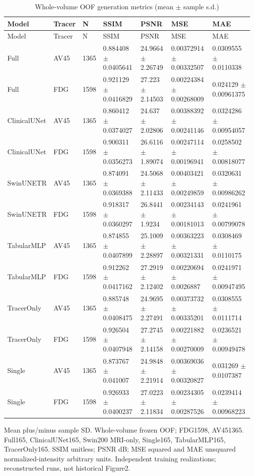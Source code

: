 \begin{landscape}
\begingroup
\footnotesize
\setlength{\tabcolsep}{4pt}
\begin{longtable}{lllllll}
\caption{Whole-volume OOF generation metrics (mean $\pm$ sample s.d.)}\label{tab:whole_volume_generation}\\
\toprule
Model & Tracer & N & SSIM & PSNR & MSE & MAE \\
\midrule
\endfirsthead
\toprule
Model & Tracer & N & SSIM & PSNR & MSE & MAE \\
\midrule
\endhead
\bottomrule
\endfoot
Full & AV45 & 1365 & 0.884408 \(\pm\) 0.0405641 & 24.9664 \(\pm\) 2.26749 & 0.00372914 \(\pm\) 0.00332507 & 0.0309555 \(\pm\) 0.0110338 \\
Full & FDG & 1598 & 0.921129 \(\pm\) 0.0416829 & 27.223 \(\pm\) 2.14503 & 0.00224384 \(\pm\) 0.00268009 & 0.024129 \(\pm\) 0.00961375 \\
ClinicalUNet & AV45 & 1365 & 0.860412 \(\pm\) 0.0374027 & 24.637 \(\pm\) 2.02806 & 0.00388392 \(\pm\) 0.00241146 & 0.0324286 \(\pm\) 0.00954057 \\
ClinicalUNet & FDG & 1598 & 0.900311 \(\pm\) 0.0356273 & 26.6116 \(\pm\) 1.89074 & 0.00247114 \(\pm\) 0.00196941 & 0.0258502 \(\pm\) 0.00818077 \\
SwinUNETR & AV45 & 1365 & 0.874091 \(\pm\) 0.0369388 & 24.5068 \(\pm\) 2.11433 & 0.00403421 \(\pm\) 0.00249859 & 0.0320631 \(\pm\) 0.00986262 \\
SwinUNETR & FDG & 1598 & 0.918317 \(\pm\) 0.0360297 & 26.8441 \(\pm\) 1.9234 & 0.00234143 \(\pm\) 0.00181013 & 0.0241961 \(\pm\) 0.00799078 \\
TabularMLP & AV45 & 1365 & 0.874855 \(\pm\) 0.0407899 & 25.1009 \(\pm\) 2.28897 & 0.00363223 \(\pm\) 0.00321331 & 0.0308469 \(\pm\) 0.0110175 \\
TabularMLP & FDG & 1598 & 0.912262 \(\pm\) 0.0417162 & 27.2919 \(\pm\) 2.12402 & 0.00220694 \(\pm\) 0.0026887 & 0.0241971 \(\pm\) 0.00947495 \\
TracerOnly & AV45 & 1365 & 0.885748 \(\pm\) 0.0408475 & 24.9695 \(\pm\) 2.27491 & 0.00373732 \(\pm\) 0.00335201 & 0.0308555 \(\pm\) 0.0111714 \\
TracerOnly & FDG & 1598 & 0.926504 \(\pm\) 0.0407948 & 27.2745 \(\pm\) 2.14158 & 0.00221882 \(\pm\) 0.00270009 & 0.0236521 \(\pm\) 0.00949478 \\
Single & AV45 & 1365 & 0.873767 \(\pm\) 0.041007 & 24.9848 \(\pm\) 2.21914 & 0.00369036 \(\pm\) 0.00320827 & 0.031269 \(\pm\) 0.0107387 \\
Single & FDG & 1598 & 0.926933 \(\pm\) 0.0400237 & 27.0223 \(\pm\) 2.11834 & 0.00234305 \(\pm\) 0.00287526 & 0.0239414 \(\pm\) 0.00968223 \\
\end{longtable}
\noindent\parbox{\linewidth}{\footnotesize Mean plus/minus sample SD. Whole-volume frozen OOF; FDG1598, AV451365. Full165, ClinicalUNet165, Swin200 MRI-only, Single165, TabularMLP165, TracerOnly165. SSIM unitless; PSNR dB; MSE squared and MAE unsquared normalized-intensity arbitrary units. Independent training realizations; reconstructed runs, not historical Figure2.}
\endgroup
\end{landscape}
